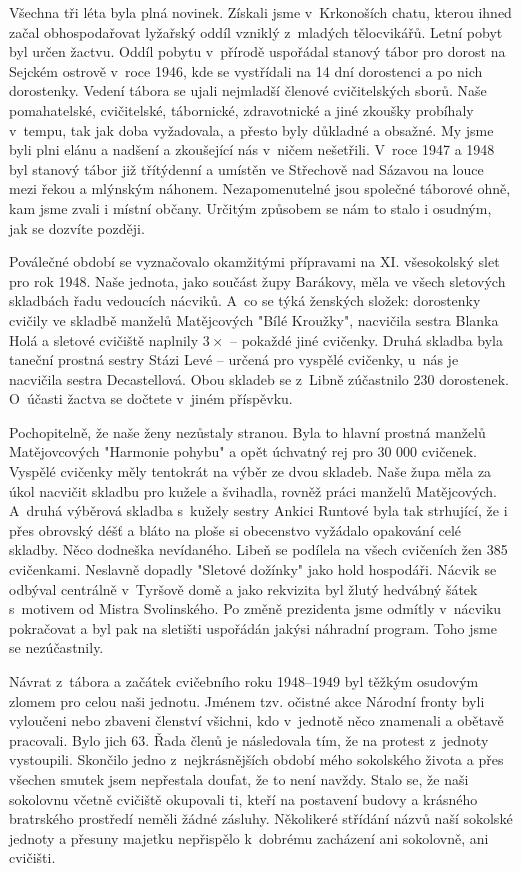 \documentclass[a5paper, 11pt, twoside]{article}
\begin{document}
Všechna tři léta byla plná novinek. Získali jsme v~Krkonoších chatu,
kterou ihned začal obhospodařovat lyžařský oddíl vzniklý z~mladých
tělocvikářů. Letní pobyt byl určen žactvu. Oddíl pobytu v~přírodě
uspořádal stanový tábor pro dorost na Sejckém ostrově v~roce 1946, kde
se vystřídali na 14 dní dorostenci a po nich dorostenky. Vedení tábora
se ujali nejmladší členové cvičitelských sborů. Naše pomahatelské,
cvičitelské, tábornické, zdravotnické a jiné zkoušky probíhaly v~tempu,
tak jak doba vyžadovala, a přesto byly důkladné a obsažné. My jsme byli
plni elánu a nadšení a zkoušející nás v~ničem nešetřili. V~roce 1947 a
1948 byl stanový tábor již třítýdenní a umístěn ve Střechově nad Sázavou
na louce mezi řekou a mlýnským náhonem. Nezapomenutelné jsou společné
táborové ohně, kam jsme zvali i místní občany. Určitým způsobem se nám
to stalo i osudným, jak se dozvíte později.

Poválečné období se vyznačovalo okamžitými přípravami na XI. všesokolský
slet pro rok 1948. Naše jednota, jako součást župy Barákovy, měla ve
všech sletových skladbách řadu vedoucích nácviků. A~co se týká ženských
složek: dorostenky cvičily ve skladbě manželů Matějcových "Bílé
Kroužky", nacvičila sestra Blanka Holá a sletové cvičiště naplnily \(3\times\)
-- pokaždé jiné cvičenky. Druhá skladba byla taneční prostná sestry
Stázi Levé -- určená pro vyspělé cvičenky, u~nás je nacvičila sestra
Decastellová. Obou skladeb se z~Libně zúčastnilo 230 dorostenek.
O~účasti žactva se dočtete v~jiném příspěvku.

Pochopitelně, že naše ženy nezůstaly stranou. Byla to hlavní prostná
manželů Matějovcových "Harmonie pohybu" a opět úchvatný rej pro 30 000
cvičenek. Vyspělé cvičenky měly tentokrát na výběr ze dvou skladeb. Naše
župa měla za úkol nacvičit skladbu pro kužele a švihadla, rovněž práci
manželů Matějcových. A~druhá výběrová skladba s~kužely sestry Ankici
Runtové byla tak strhující, že i přes obrovský déšť a bláto na ploše si
obecenstvo vyžádalo opakování celé skladby. Něco dodneška nevídaného.
Libeň se podílela na všech cvičeních žen 385 cvičenkami. Neslavně
dopadly "Sletové dožínky" jako hold hospodáři. Nácvik se odbýval
centrálně v~Tyršově domě a jako rekvizita byl žlutý hedvábný šátek
s~motivem od Mistra Svolinského. Po změně prezidenta jsme odmítly
v~nácviku pokračovat a byl pak na sletišti uspořádán jakýsi náhradní
program. Toho jsme se nezúčastnily.

Návrat z~tábora a začátek cvičebního roku 1948--1949 byl
těžkým osudovým zlomem pro celou naši jednotu. Jménem tzv. očistné akce
Národní fronty byli vyloučeni nebo zbaveni členství všichni, kdo
v~jednotě něco znamenali a obětavě pracovali. Bylo jich 63. Řada členů je
následovala tím, že na protest z~jednoty vystoupili. Skončilo jedno
z~nejkrásnějších období mého sokolského života a přes všechen smutek jsem
nepřestala doufat, že to není navždy. Stalo se, že naši sokolovnu včetně
cvičiště okupovali ti, kteří na postavení budovy a krásného bratrského
prostředí neměli žádné zásluhy. Několikeré střídání názvů naší sokolské
jednoty a přesuny majetku nepřispělo k~dobrému zacházení ani sokolovně,
ani cvičišti.
\end{document}
